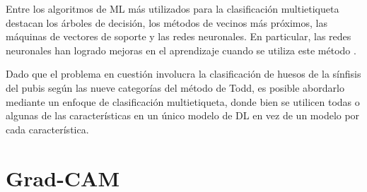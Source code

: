 Entre los algoritmos de ML más utilizados para la clasificación multietiqueta destacan los árboles de decisión, los métodos de vecinos más próximos, las máquinas de vectores de soporte y las redes neuronales. En particular, las redes neuronales han logrado mejoras en el aprendizaje cuando se utiliza este método \cite{ranjan_hyperface_2019}.

Dado que el problema en cuestión involucra la clasificación de huesos de la sínfisis del pubis según las nueve categorías del método de Todd, es posible abordarlo mediante un enfoque de clasificación multietiqueta, donde bien se utilicen todas o algunas de las características en un único modelo de DL en vez de un modelo por cada característica.

\section{Grad-CAM}
\label{section2:gradcam}

